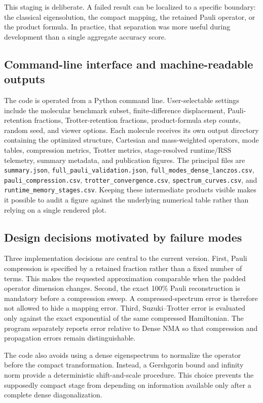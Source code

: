 \documentclass[aip,jcp,reprint,amsmath,amssymb,floatfix]{revtex4-2}
\begin{document}
This staging is deliberate. A failed result can be localized to a specific boundary: the classical eigensolution, the compact mapping, the retained Pauli operator, or the product formula. In practice, that separation was more useful during development than a single aggregate accuracy score.

\subsection{Command-line interface and machine-readable outputs}
The code is operated from a Python command line. User-selectable settings include the molecular benchmark subset, finite-difference displacement, Pauli-retention fractions, Trotter-retention fractions, product-formula step counts, random seed, and viewer options. Each molecule receives its own output directory containing the optimized structure, Cartesian and mass-weighted operators, mode tables, compression metrics, Trotter metrics, stage-resolved runtime/RSS telemetry, summary metadata, and publication figures. The principal files are \texttt{summary.json}, \texttt{full\_pauli\_validation.json}, \texttt{full\_modes\_dense\_lanczos.csv}, \texttt{pauli\_compression.csv}, \texttt{trotter\_convergence.csv}, \texttt{spectrum\_curves.csv}, and \texttt{runtime\_memory\_stages.csv}. Keeping these intermediate products visible makes it possible to audit a figure against the underlying numerical table rather than relying on a single rendered plot.

\subsection{Design decisions motivated by failure modes}
Three implementation decisions are central to the current version. First, Pauli compression is specified by a retained fraction rather than a fixed number of terms. This makes the requested approximation comparable when the padded operator dimension changes. Second, the exact 100\% Pauli reconstruction is mandatory before a compression sweep. A compressed-spectrum error is therefore not allowed to hide a mapping error. Third, Suzuki--Trotter error is evaluated only against the exact exponential of the same compressed Hamiltonian. The program separately reports error relative to Dense NMA so that compression and propagation errors remain distinguishable.

The code also avoids using a dense eigenspectrum to normalize the operator before the compact transformation. Instead, a Gershgorin bound and infinity norm provide a deterministic shift-and-scale procedure. This choice prevents the supposedly compact stage from depending on information available only after a complete dense diagonalization.
\end{document}
